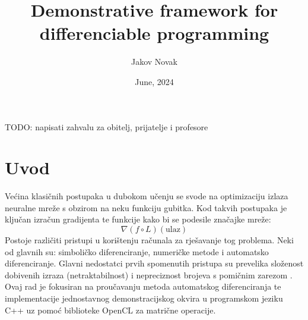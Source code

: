 \documentclass[zavrsnirad]{fer}
\title{Demonstrative framework for differenciable programming}
\author{Jakov Novak}
\date{June, 2024}
\begin{document}
\maketitle






\begin{zahvale}
  TODO: napisati zahvalu za obitelj, prijatelje i profesore
\end{zahvale}


\mainmatter


\tableofcontents


\chapter{Uvod}
\label{pog:uvod}

Većina klasičnih postupaka u dubokom učenju se svode na optimizaciju izlaza neuralne mreže s obzirom na neku funkciju gubitka. Kod takvih postupaka je ključan izračun gradijenta te funkcije kako bi se podesile značajke mreže:
\begin{equation}
  \nabla (f \circ L) (\mathrm{ulaz})
\end{equation}
Postoje različiti pristupi u korištenju računala za rješavanje tog problema. Neki od glavnih su: simboličko diferenciranje, numeričke metode i automatsko diferenciranje. Glavni nedostatci prvih spomenutih pristupa su prevelika složenost dobivenih izraza (netraktabilnost) \cite{durrbaum2002comparison} i nepreciznost brojeva s pomičnim zarezom \cite{numerical}. Ovaj rad je fokusiran na proučavanju metoda automatskog diferenciranja te implementacije jednostavnog demonstracijskog okvira u programskom jeziku C++ uz pomoć biblioteke OpenCL za matrične operacije.
\end{document}
